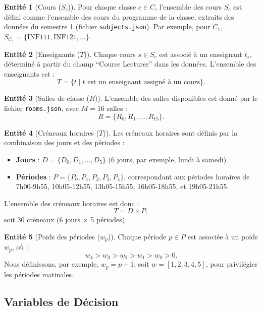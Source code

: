 \documentclass[11pt, a4paper]{article}
\theoremstyle{definition}
\newtheorem{entite}{Entité}
\begin{document}
\begin{entite}[Cours ($S_c$)]
Pour chaque classe \( c \in C \), l'ensemble des cours \( S_c \) est défini comme l'ensemble des cours du programme de la classe, extraits des données du semestre 1 (fichier \texttt{subjects.json}). Par exemple, pour \( C_1 \), \( S_{C_1} = \{\text{INF111}, \text{INF121}, \dots \}\).
\end{entite}

\begin{entite}[Enseignants ($T$)]
Chaque cours \( s \in S_c \) est associé à un enseignant \( t_s \), déterminé à partir du champ ``Course Lecturer'' dans les données. L'ensemble des enseignants est :
\[
T = \{ t \mid t \text{ est un enseignant assigné à un cours} \}.
\]
\end{entite}

\begin{entite}[Salles de classe ($R$)]
L'ensemble des salles disponibles est donné par le fichier \texttt{rooms.json}, avec \( M = 16 \) salles :
\[
R = \{ R_0, R_1, \dots, R_{15} \}.
\]
\end{entite}

\begin{entite}[Créneaux horaires ($T$)]
Les créneaux horaires sont définis par la combinaison des jours et des périodes :
\begin{itemize}
    \item \textbf{Jours} : \( D = \{ D_0, D_1, \dots, D_5 \} \) (6 jours, par exemple, lundi à samedi).
    \item \textbf{Périodes} : \( P = \{ P_0, P_1, P_2, P_3, P_4 \} \), correspondant aux périodes horaires de 7h00-9h55, 10h05-12h55, 13h05-15h55, 16h05-18h55, et 19h05-21h55.
\end{itemize}
L'ensemble des créneaux horaires est donc :
\[
T = D \times P,
\]
soit 30 créneaux (6 jours \(\times\) 5 périodes).
\end{entite}

\begin{entite}[Poids des périodes ($w_p$)]
Chaque période \( p \in P \) est associée à un poids \( w_p \), où :
\[
w_4 > w_3 > w_2 > w_1 > w_0 > 0.
\]
Nous définissons, par exemple, \( w_p = p + 1 \), soit \( w = [1, 2, 3, 4, 5] \), pour privilégier les périodes matinales.
\end{entite}

\subsection{Variables de Décision}
\end{document}
